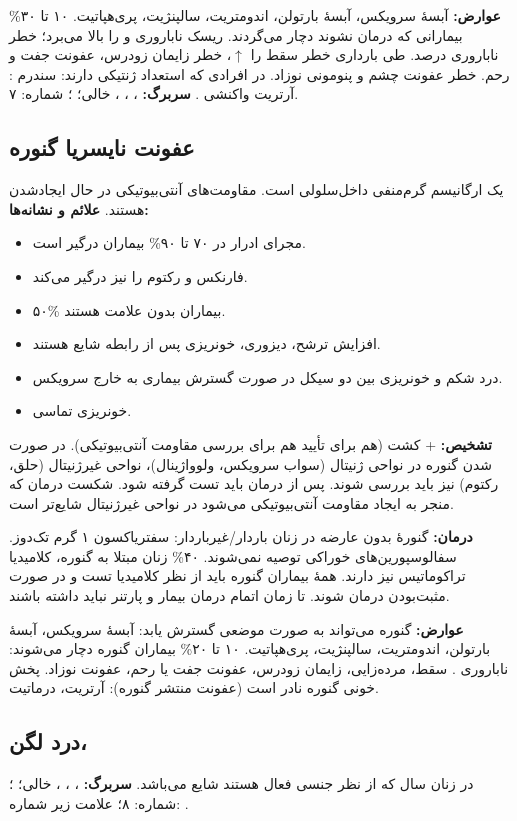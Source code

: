 \documentclass[12pt,a4paper]{article}
\begin{document}
\textbf{عوارض:} آبسهٔ سرویکس، آبسهٔ بارتولن، اندومتریت، سالپنژیت، پری‌هپاتیت.
۱۰ تا ۳۰\% بیمارانی که درمان نشوند دچار  می‌گردند.
ریسک ناباروری  و  را بالا می‌برد؛ خطر ناباروری  درصد.
طی بارداری خطر سقط را $\uparrow$، خطر زایمان زودرس، عفونت جفت و رحم.
خطر عفونت چشم و پنومونی نوزاد.
در افرادی که استعداد ژنتیکی دارند: سندرم : آرتریت واکنشی .
\textbf{سربرگ:} ، ، ،  خالی؛ ؛ شماره: ۷.
\subsection*{عفونت نایسریا گنوره}
یک ارگانیسم گرم‌منفی داخل‌سلولی است. مقاومت‌های آنتی‌بیوتیکی در حال ایجادشدن هستند.
\textbf{علائم و نشانه‌ها:}
\begin{itemize}
\item مجرای ادرار در ۷۰ تا ۹۰\% بیماران درگیر است.
\item فارنکس و رکتوم را نیز درگیر می‌کند.
\item ۵۰\% بیماران بدون علامت هستند.
\item افزایش ترشح، دیزوری، خونریزی پس از رابطه شایع هستند.
\item درد شکم و خونریزی بین دو سیکل در صورت گسترش بیماری به خارج سرویکس.
\item خونریزی تماسی.
\end{itemize}
\textbf{تشخیص:}  + کشت (هم برای تأیید هم برای بررسی مقاومت آنتی‌بیوتیکی).
در صورت  شدن گنوره در نواحی ژنیتال (سواب سرویکس، ولوواژینال)، نواحی غیرژنیتال (حلق، رکتوم) نیز باید بررسی شوند.
پس از درمان باید تست  گرفته شود.
شکست درمان که منجر به ایجاد مقاومت آنتی‌بیوتیکی می‌شود در نواحی غیرژنیتال شایع‌تر است.

\textbf{درمان:}
گنورهٔ بدون عارضه در زنان باردار/غیرباردار: سفتریاکسون  ۱ گرم تک‌دوز.
سفالوسپورین‌های خوراکی توصیه نمی‌شوند.
۴۰\% زنان مبتلا به گنوره، کلامیدیا تراکوماتیس نیز دارند.
همهٔ بیماران گنوره باید از نظر کلامیدیا تست و در صورت مثبت‌بودن درمان شوند.
تا زمان اتمام درمان بیمار و پارتنر نباید  داشته باشند.

\textbf{عوارض:} گنوره می‌تواند به صورت موضعی گسترش یابد: آبسهٔ سرویکس، آبسهٔ بارتولن، اندومتریت، سالپنژیت، پری‌هپاتیت.
۱۰ تا ۲۰\% بیماران گنوره دچار  می‌شوند: ناباروری .
سقط، مرده‌زایی، زایمان زودرس، عفونت جفت یا رحم، عفونت نوزاد.
پخش خونی گنوره نادر است (عفونت منتشر گنوره): آرتریت، درماتیت.
\subsection*{درد لگن، }
 در زنان  سال که از نظر جنسی فعال هستند شایع می‌باشد.
\textbf{سربرگ:} ، ، ،  خالی؛ ؛ شماره: ۸؛ علامت زیر شماره: .
\end{document}
